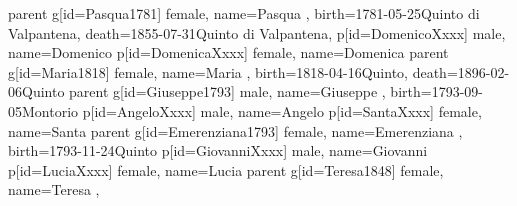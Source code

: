 \documentclass{article}
\begin{document}
\begin{midpage}
\begin{center}
\begin{genealogypicture}
{{{{{{{{{                                }
                            }
                        }
                        parent{
                            g[id=Pasqua1781]{
                                female,
                                name={Pasqua },
                                birth={1781-05-25}{Quinto di Valpantena},
                                death={1855-07-31}{Quinto di Valpantena},
                            }
                            p[id=DomenicoXxxx]{
                                male,
                                name={Domenico }
                            }
                            p[id=DomenicaXxxx]{
                                female,
                                name={Domenica}
                            }
                        }
                    }
                    parent{
                        g[id=Maria1818]{
                            female,
                            name={Maria },
                            birth={1818-04-16}{Quinto},
                            death={1896-02-06}{Quinto}
                        }
                        parent{
                            g[id=Giuseppe1793]{
                                male,
                                name={Giuseppe },
                                birth={1793-09-05}{Montorio}
                            }
                            p[id=AngeloXxxx]{
                                male,
                                name={Angelo }
                            }
                            p[id=SantaXxxx]{
                                female,
                                name={Santa}
                            }
                        }
                        parent{
                            g[id=Emerenziana1793]{
                                female,
                                name={Emerenziana },
                                birth={1793-11-24}{Quinto}
                            }
                            p[id=GiovanniXxxx]{
                                male,
                                name={Giovanni }
                            }
                            p[id=LuciaXxxx]{
                                female,
                                name={Lucia }
                            }
                        }
                    }
                }
                parent{
                    g[id=Teresa1848]{
                        female,
                        name={Teresa },
}}}}}}
\end{genealogypicture}
\end{center}
\end{midpage}
\end{document}

